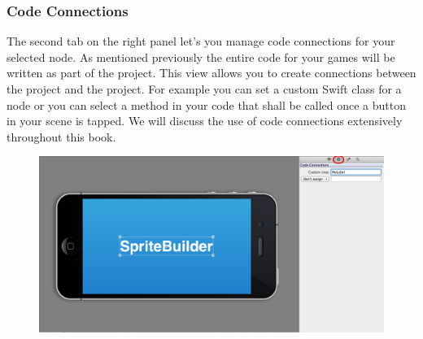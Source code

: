 \subsubsection{Code Connections} 
The second tab on the right panel let's you manage code connections for your
selected node. As mentioned previously the entire code for your games will be
written as part of the \xcode{} project. This view allows you to create
connections between the \xcode{} project and the \SB{} project. For example you
can set a custom Swift class for a node or you can select a method in your code
that shall be called once a button in your scene is tapped. We will discuss the
use of code connections extensively throughout this book.
\begin{figure}[H]
		\centering
		\includegraphics[width=0.8\linewidth]{images/spritebuilder/spritebuilder_codeconnections.png}     
\end{figure} 


